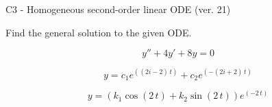\begin{exercise}
  \begin{exerciseTitle}C3 - Homogeneous second-order linear ODE (ver. 21)\end{exerciseTitle}
  \begin{exerciseStatement}
    
Find the general solution to the given ODE.

    
\[y''+4y'+8y = 0\]

  \end{exerciseStatement}
  \begin{exerciseAnswer}
    
\[y= c_{1} e^{\left(\left(2 i - 2\right) \, t\right)} + c_{2} e^{\left(-\left(2 i + 2\right) \, t\right)}\]

    
\[y= {\left(k_{1} \cos\left(2 \, t\right) + k_{2} \sin\left(2 \, t\right)\right)} e^{\left(-2 \, t\right)}\]

  \end{exerciseAnswer}
\end{exercise}
